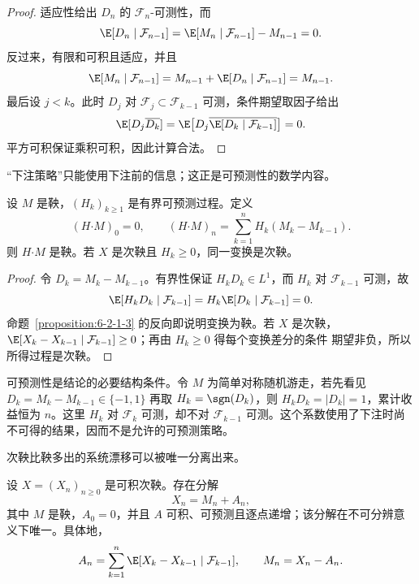 \begin{proof}
适应性给出 $D_n$ 的 $\mathcal F_n$-可测性，而
\[
 \E[D_n\mid\mathcal F_{n-1}]
 =\E[M_n\mid\mathcal F_{n-1}]-M_{n-1}=0.
\]
反过来，有限和可积且适应，并且
\[
 \E[M_n\mid\mathcal F_{n-1}]
 =M_{n-1}+\E[D_n\mid\mathcal F_{n-1}]=M_{n-1}.
\]
最后设 $j<k$。此时 $D_j$ 对 $\mathcal F_j\subset\mathcal F_{k-1}$ 可测，条件期望取因子给出
\[
 \E[D_j\overline{D_k}]
 =\E\bigl[D_j\overline{\E[D_k\mid\mathcal F_{k-1}]}\bigr]=0.
\]
平方可积保证乘积可积，因此计算合法。
\end{proof}

“下注策略”只能使用下注前的信息；这正是可预测性的数学内容。

\begin{proposition}[可预测变换]\label{proposition:6-2-1-4}
设 $M$ 是鞅，$(H_k)_{k\ge1}$ 是有界可预测过程。定义
\[
 (H\mathbin{\boldsymbol\cdot}M)_0=0,
 \qquad
 (H\mathbin{\boldsymbol\cdot}M)_n
 =\sum_{k=1}^nH_k(M_k-M_{k-1}).
\]
则 $H\mathbin{\boldsymbol\cdot}M$ 是鞅。若 $X$ 是次鞅且 $H_k\ge0$，同一变换是次鞅。
\end{proposition}

\begin{proof}
令 $D_k=M_k-M_{k-1}$。有界性保证 $H_kD_k\in L^1$，而
$H_k$ 对 $\mathcal F_{k-1}$ 可测，故
\[
 \E[H_kD_k\mid\mathcal F_{k-1}]
 =H_k\E[D_k\mid\mathcal F_{k-1}]=0.
\]
命题~\ref{proposition:6-2-1-3} 的反向即说明变换为鞅。若 $X$ 是次鞅，
$\E[X_k-X_{k-1}\mid\mathcal F_{k-1}]\ge0$；再由 $H_k\ge0$ 得每个变换差分的条件
期望非负，所以所得过程是次鞅。
\end{proof}

可预测性是结论的必要结构条件。令 $M$ 为简单对称随机游走，若先看见
$D_k=M_k-M_{k-1}\in\{-1,1\}$ 再取 $H_k=\sgn(D_k)$，则
$H_kD_k=|D_k|=1$，累计收益恒为 $n$。这里 $H_k$ 对 $\mathcal F_k$ 可测，却不对
$\mathcal F_{k-1}$ 可测。这个系数使用了下注时尚不可得的结果，因而不是允许的可预测策略。

次鞅比鞅多出的系统漂移可以被唯一分离出来。

\begin{proposition}[离散 Doob 分解]\label{proposition:6-2-1-5}
设 $X=(X_n)_{n\ge0}$ 是可积次鞅。存在分解
\[
  X_n=M_n+A_n,
\]
其中 $M$ 是鞅，$A_0=0$，并且 $A$ 可积、可预测且逐点递增；该分解在不可分辨意义下唯一。具体地，
\begin{equation}\label{eq:6-2-doob-decomposition}
 A_n=\sum_{k=1}^n
 \E[X_k-X_{k-1}\mid\mathcal F_{k-1}],
 \qquad M_n=X_n-A_n.
\end{equation}
\end{proposition}


